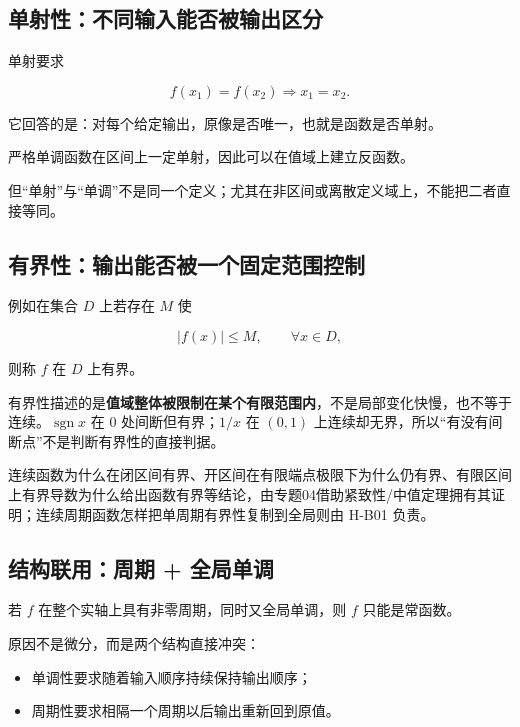 \documentclass[11pt,a4paper]{ctexart}
\providecommand{\tightlist}{}
\begin{document}
\subsection{单射性：不同输入能否被输出区分}\label{ux5355ux5c04ux6027ux4e0dux540cux8f93ux5165ux80fdux5426ux88abux8f93ux51faux533aux5206}

单射要求

\[
f(x_1)=f(x_2)\Longrightarrow x_1=x_2.
\]

它回答的是：对每个给定输出，原像是否唯一，也就是函数是否单射。

严格单调函数在区间上一定单射，因此可以在值域上建立反函数。

但``单射''与``单调''不是同一个定义；尤其在非区间或离散定义域上，不能把二者直接等同。

\subsection{有界性：输出能否被一个固定范围控制}\label{ux6709ux754cux6027ux8f93ux51faux80fdux5426ux88abux4e00ux4e2aux56faux5b9aux8303ux56f4ux63a7ux5236}

例如在集合 \(D\) 上若存在 \(M\) 使

\[
\lvert f(x)\rvert\le M,\qquad \forall x\in D,
\]

则称 \(f\) 在 \(D\) 上有界。

有界性描述的是\textbf{值域整体被限制在某个有限范围内}，不是局部变化快慢，也不等于连续。$\operatorname{sgn}x$ 在 $0$ 处间断但有界；$1/x$ 在 $(0,1)$ 上连续却无界，所以“有没有间断点”不是判断有界性的直接判据。

连续函数为什么在闭区间有界、开区间在有限端点极限下为什么仍有界、有限区间上有界导数为什么给出函数有界等结论，由专题04借助紧致性/中值定理拥有其证明；连续周期函数怎样把单周期有界性复制到全局则由 H-B01 负责。

\subsection{结构联用：周期 + 全局单调}\label{ux7ed3ux6784ux8054ux7528ux5468ux671f-ux5168ux5c40ux5355ux8c03}

若 \(f\) 在整个实轴上具有非零周期，同时又全局单调，则 \(f\)
只能是常函数。

原因不是微分，而是两个结构直接冲突：

\begin{itemize}
\tightlist
\item
  单调性要求随着输入顺序持续保持输出顺序；
\item
  周期性要求相隔一个周期以后输出重新回到原值。
\end{itemize}
\end{document}
